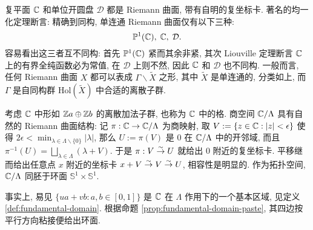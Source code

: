 \begin{example}
	复平面 $\mathbb{C}$ 和单位开圆盘 $\mathcal{D}$ 都是 Riemann 曲面, 带有自明的复坐标卡. 著名的均一化定理断言: 精确到同构, 单连通 Riemann 曲面仅有以下三种:
	\[ \mathbb{P}^1(\mathbb{C}), \; \mathbb{C}, \; \mathcal{D}. \]
	容易看出这三者互不同构: 首先 $\mathbb{P}^1(\mathbb{C})$ 紧而其余非紧, 其次 Liouville 定理断言 $\mathbb{C}$ 上的有界全纯函数必为常值, 在 $\mathcal{D}$ 上则不然, 因此 $\mathbb{C}$ 和 $\mathcal{D}$ 也不同构. 一般而言, 任何 Riemann 曲面 $X$ 都可以表成 $\Gamma \backslash \tilde{X}$ 之形, 其中 $\tilde{X}$ 是单连通的, 分类如上, 而 $\Gamma$ 是自同构群 $\text{Hol}(\tilde{X})$ 中合适的离散子群.
\end{example}

\begin{example}[复环面]\label{eg:complex-tori}  
	考虑 $\mathbb{C}$ 中形如 $\mathbb{Z} a \oplus \mathbb{Z} b$ 的离散加法子群, 也称为 $\mathbb{C}$ 中的格. 商空间 $\mathbb{C}/\Lambda$ 具有自然的 Riemann 曲面结构: 记 $\pi: \mathbb{C} \to \mathbb{C}/\Lambda$ 为商映射, 取 $V := \{z \in \mathbb{C}: |z| < \epsilon \}$ 使得 $2\epsilon < \min_{\lambda \in \Lambda \smallsetminus \{0\}} |\lambda|$, 那么 $U := \pi(V)$ 是 $0$ 在 $\mathbb{C}/\Lambda$ 中的开邻域, 而且 $\pi^{-1}(U) = \bigsqcup_{\lambda \in \Lambda} (\lambda + V)$. 于是 $\pi: V \stackrel{\sim}{\rightarrow} U$ 就给出 $0$ 附近的复坐标卡. 平移继而给出任意点 $x$ 附近的坐标卡 $x+V \stackrel{\sim}{\rightarrow} V \stackrel{\sim}{\rightarrow} U$, 相容性是明显的. 作为拓扑空间, $\mathbb{C}/\Lambda$ 同胚于环面 $\mathbb{S}^1 \times \mathbb{S}^1$.
	
	\begin{center}\end{center}

	事实上, 易见 $\{ua+vb : a, b \in [0,1] \}$ 是 $\mathbb{C}$ 在 $\Lambda$ 作用下的一个基本区域, 见定义 \ref{def:fundamental-domain}. 根据命题 \ref{prop:fundamental-domain-paste}, 其四边按平行方向粘接便给出环面.
\end{example}


